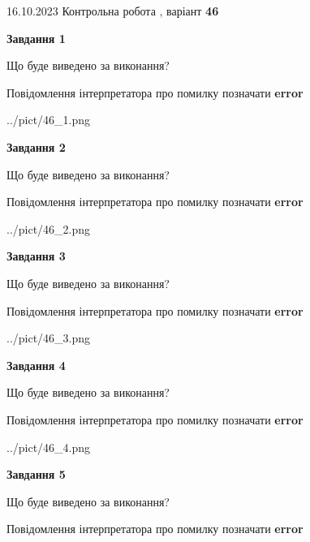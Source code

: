 \documentclass[12pt, ukrainian]{article}
\begin{document}
{\Large{16.10.2023 Контрольна робота , варіант  \No \textbf { 46 }\par}}
{
\begin {large}
{\begin {center}\textbf{Завдання 1}\end {center}}\par
Що буде виведено за виконання? \par
Повідомлення інтерпретатора про помилку позначати \textbf{error}

\begin{center}
	{../pict/46_1.png}
\end{center}
\newpage

{\begin {center}\textbf{Завдання 2}\end {center}}\par
Що буде виведено за виконання? \par
Повідомлення інтерпретатора про помилку позначати \textbf{error}

\begin{center}
	{../pict/46_2.png}
\end{center}
\newpage

{\begin {center}\textbf{Завдання 3}\end {center}}\par
Що буде виведено за виконання? \par
Повідомлення інтерпретатора про помилку позначати \textbf{error}

\begin{center}
	{../pict/46_3.png}
\end{center}
\newpage

{\begin {center}\textbf{Завдання 4}\end {center}}\par
Що буде виведено за виконання? \par
Повідомлення інтерпретатора про помилку позначати \textbf{error}

\begin{center}
	{../pict/46_4.png}
\end{center}
\newpage

{\begin {center}\textbf{Завдання 5}\end {center}}\par
Що буде виведено за виконання? \par
Повідомлення інтерпретатора про помилку позначати \textbf{error}


\end{large}}
\end{document}
